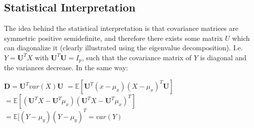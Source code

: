 \documentclass[english]{latex4ei/latex4ei_sheet}
\begin{document}
\begin{sectionbox}
\subsection{Statistical Interpretation}
The idea behind the statistical interpretation is that covariance matrices are symmetric positive semidefinite, and therefore there exists some matrix $U$ which can diagonalize it (clearly illustrated using the eigenvalue decomposition). I.e. $Y=\boldsymbol{U}^TX$ with $\boldsymbol{U}^T\boldsymbol{U}=I_p$, such that the covariance matrix of $Y$ is diagonal and the variances decrease. In the same way:
\begin{emphbox}
        $\boldsymbol{D}=\boldsymbol{U}^Tvar(X)\boldsymbol{U} $
        $= \mathbb{E}[\boldsymbol{U}^T(x-\mu_x)(X-\mu_x)^T\boldsymbol{U}]$
        $=\mathbb{E}[(\boldsymbol{U}^TX-\boldsymbol{U}^T\mu_x)(\boldsymbol{U}^TX-\boldsymbol{U}^T\mu_x)^T]$
        $=\mathbb{E}[(Y-\mu_y)(Y-\mu_y)^T=var(Y)$
\end{emphbox}
\end{sectionbox}
\end{document}
